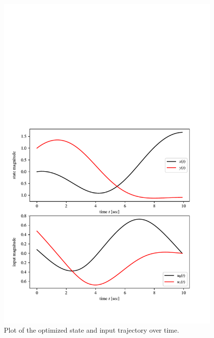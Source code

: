 \begin{figure}[h]
    \centering
    \includegraphics[]{hw5.pdf}
    \vspace{-5mm}
    \caption{Plot of the optimized state and input trajectory over time.}
    \label{fig:ergodic_time}
\end{figure}
